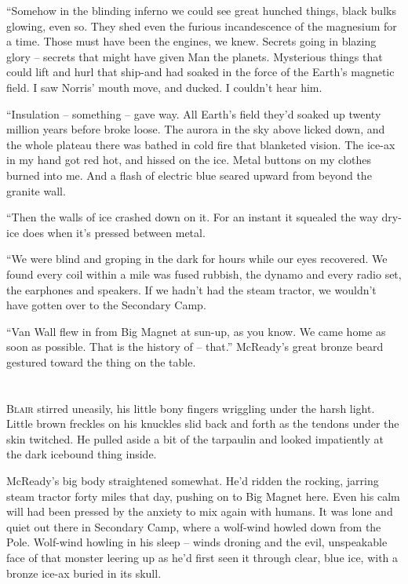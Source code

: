 \documentclass[ebook,oneside,11pt]{memoir}				%
\begin{document}
``Somehow in the blinding inferno we could see great hunched things, black bulks glowing, even so. They shed even the furious incandescence of the magnesium for a time. Those must have been the engines, we knew. Secrets going in blazing glory -- secrets that might have given Man the planets. Mysterious things that could lift and hurl that ship-and had soaked in the force of the Earth's magnetic field. I saw Norris' mouth move, and ducked. I couldn't hear him.

``Insulation – something -- gave way. All Earth's field they'd soaked up twenty million years before broke loose. The aurora in the sky above licked down, and the whole plateau there was bathed in cold fire that blanketed vision. The ice-ax in my hand got red hot, and hissed on the ice. Metal buttons on my clothes burned into me. And a flash of electric blue seared upward from beyond the granite wall.

``Then the walls of ice crashed down on it. For an instant it squealed the way dry-ice does when it's pressed between metal.

``We were blind and groping in the dark for hours while our eyes recovered. We found every coil within a mile was fused rubbish, the dynamo and every radio set, the earphones and speakers. If we hadn't had the steam tractor, we wouldn't have gotten over to the Secondary Camp.

``Van Wall flew in from Big Magnet at sun-up, as you know. We came home as soon as possible. That is the history of -- that.'' McReady's great bronze beard gestured toward the thing on the table.

\chapter[Chapter 2]{}
\lettrine[lines=3,findent=2pt,nindent=2pt]{B}{lair} stirred uneasily, his little bony fingers wriggling under the harsh light. Little brown freckles on his knuckles slid back and forth as the tendons under the skin twitched. He pulled aside a bit of the tarpaulin and looked impatiently at the dark icebound thing inside.

McReady's big body straightened somewhat. He'd ridden the rocking, jarring steam tractor forty miles that day, pushing on to Big Magnet here. Even his calm will had been pressed by the anxiety to mix again with humans. It was lone and quiet out there in Secondary Camp, where a wolf-wind howled down from the Pole. Wolf-wind howling in his sleep -- winds droning and the evil, unspeakable face of that monster leering up as he'd first seen it through clear, blue ice, with a bronze ice-ax buried in its skull.
\end{document}
